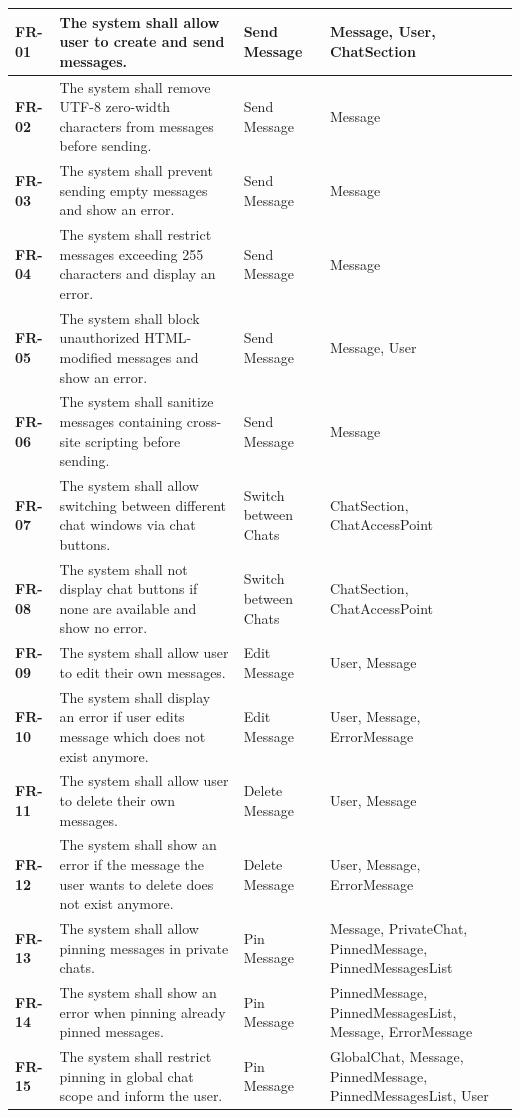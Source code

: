 \documentclass[]{VUMIFTemplateClass}
\begin{document}
\begin{longtable}{|p{3cm}|p{5.5cm}|l|p{4cm}|}
\textbf{FR-01} & The system shall allow user to create and send messages. & Send Message & Message, User, ChatSection \\
\hline
\textbf{FR-02} & The system shall remove UTF-8 zero-width characters from messages before sending. & Send Message & Message \\
\hline
\textbf{FR-03} & The system shall prevent sending empty messages and show an error. & Send Message & Message \\
\hline
\textbf{FR-04} & The system shall restrict messages exceeding 255 characters and display an error. & Send Message & Message \\
\hline
\textbf{FR-05} & The system shall block unauthorized HTML-modified messages and show an error. & Send Message & Message, User \\
\hline
\textbf{FR-06} & The system shall sanitize messages containing cross-site scripting before sending. & Send Message & Message \\
\hline
\textbf{FR-07} & The system shall allow switching between different chat windows via chat buttons. & Switch between Chats & ChatSection, ChatAccessPoint \\
\hline
\textbf{FR-08} & The system shall not display chat buttons if none are available and show no error. & Switch between Chats & ChatSection, ChatAccessPoint \\
\hline
\textbf{FR-09} & The system shall allow user to edit their own messages. & Edit Message & User, Message \\
\hline
\textbf{FR-10} & The system shall display an error if user edits message which does not exist anymore. & Edit Message & User, Message, ErrorMessage \\
\hline
\textbf{FR-11} & The system shall allow user to delete their own messages. & Delete Message & User, Message \\
\hline
\textbf{FR-12} & The system shall show an error if the message the user wants to delete does not exist anymore. & Delete Message & User, Message, ErrorMessage \\
\hline
\textbf{FR-13} & The system shall allow pinning messages in private chats. & Pin Message & Message, PrivateChat, PinnedMessage, PinnedMessagesList \\
\hline
\textbf{FR-14} & The system shall show an error when pinning already pinned messages. & Pin Message & PinnedMessage, PinnedMessagesList, Message, ErrorMessage \\
\hline
\textbf{FR-15} & The system shall restrict pinning in global chat scope and inform the user. & Pin Message & GlobalChat, Message, PinnedMessage, PinnedMessagesList, User \\

\end{longtable}
\end{document}
